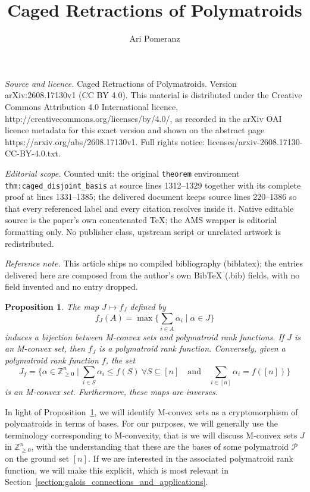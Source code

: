\documentclass[10pt,a4paper]{amsart}
\newtheorem{proposition}[theorem]{Proposition}
\newcommand{\Zgeqn}{\mathbb{Z}_{\geq 0}^n}     %
\begin{document}
\title[Caged Retractions of Polymatroids]{Caged Retractions of Polymatroids}
\author{Ari Pomeranz}
\date{}
\maketitle
\noindent\emph{Source and licence.} Caged Retractions of Polymatroids. Version arXiv:2608.17130v1 (CC BY 4.0). This material is distributed under the Creative Commons Attribution 4.0 International licence, http://creativecommons.org/licenses/by/4.0/, as recorded in the arXiv OAI licence metadata for this exact version and shown on the abstract page https://arxiv.org/abs/2608.17130v1. Full rights notice: licenses/arxiv-2608.17130-CC-BY-4.0.txt.\par\smallskip
\noindent\textit{Editorial scope.} Counted unit: the original \texttt{theorem} environment \texttt{thm:caged\_disjoint\_basis} at source lines 1312--1329 together with its complete proof at lines 1331--1385; the delivered document keeps source lines 220--1386 so that every referenced label and every citation resolves inside it. Native editable source is the paper's own concatenated TeX; the AMS wrapper is editorial formatting only. No publisher class, upstream script or unrelated artwork is redistributed.
\par\smallskip\noindent\textit{Reference note.} This article ships no compiled bibliography (biblatex); the entries delivered here are composed from the author's own BibTeX (.bib) fields, with no field invented and no entry dropped.
\begin{proposition} \label{prop:M_convex_to_rank}
    The map $J \mapsto f_J$ defined by
    \[
    f_J(A) = \max \big\{ \sum_{i\in A} \alpha_i \mid \alpha \in J \big\}
    \]
    induces a bijection between M-convex sets and polymatroid rank functions. If $J$ is an M-convex set, then $f_J$ is a polymatroid rank function. Conversely, given a polymatroid rank function $f$, the set
    \[
    J_f = \big\{ \alpha \in \Zgeqn \mid \sum_{i \in S} \alpha_i \leq f(S)\ \forall S \subseteq [n] \quad \text{and} \quad \sum_{i \in [n]}\alpha_i = f([n]) \big\}
    \]
    is an M-convex set. Furthermore, these maps are inverses.
\end{proposition}

In light of Proposition~\ref{prop:M_convex_to_rank}, we will identify M-convex sets as a cryptomorphism of polymatroids in terms of bases. For our purposes, we will generally use the terminology corresponding to M-convexity, that is we will discuss M-convex sets $J$ in $\Zgeqn$, with the understanding that these are the bases of some polymatroid $\mathcal{P}$ on the ground set $[n]$. If we are interested in the associated polymatroid rank function, we will make this explicit, which is most relevant in Section~\ref{section:galois_connections_and_applications}. 
\end{document}
